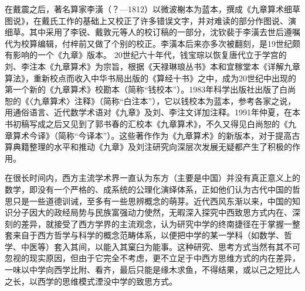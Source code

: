 \documentclass[a4paper,12pt,UTF8,twoside]{ctexbook}
\begin{document}
在戴震之后，著名算家李潢（？—1812）以微波榭本为蓝本，撰成《九章算术细草图说》，在戴氏工作的基础上又校正了许多错误文字，并对难读的部分作图说、演细草。其中采用了李锐、戴敦元等人的校订稿的一部分，沈钦裴于李潢去世后遵嘱代为校算编辑，付梓前又做了个别的校正。李潢本后来亦多次被翻刻，是19世纪颇有影响的一个《九章》版本。
20世纪六十年代，钱宝琮以恢复唐代立于学宫的刘、李注本《九章算术》为宗旨，根据《天禄琳琅丛书》本和宜稼堂本《详解九章算法》，重新校点而收入中华书局出版的《算经十书》之中，成为20世纪中出现的第一个新的《九章算术》校勘本（简称“钱校本”）。1983年科学出版社出版了白尚恕的《〈九章算术〉注释》（简称“白注本”），它以钱校本为蓝本，参考各家之说，用通俗语言、近代数学术语对《九章》及刘、李注文详加注释。1991年仲夏，在本书初稿写成之后又见到了郭书春的汇校本《九章算术》，不久又得见白尚恕的《九章算术今译》（简称“今译本”）。这些著作作为《九章算术》的新版本，对于提高古算典籍整理的水平和推动《九章》及刘注研究向深层次发展无疑都产生了积极的作用。




在很长时间内，西方主流学术界一直认为东方（主要是中国）并没有真正意义上的数学，即没有一个严格的、成系统的公理化演绎体系，正如他们认为古代中国的哲思只是一些道德训诫，至多有一些思辨概念的萌芽。近代西风东渐以来，中国的知识分子因大的政经局势与民族富强动力使然，无暇深入探究中西致思方式内在、深刻的差异，就接受了西方学界的主流观念，认为研究中学的终南捷径在于掌握一整套来自于西方哲学与科学的概念范畴体系，以便把中学的某一学科（如数学、哲学、中医等）套入其间，以能入其窠臼为能事。这种研究、思考方式当然有其不可忽视的现实原因，但由于它完全不考虑，更不立足于中西方思维方式的内在差异，一味以中学向西学比附、看齐，最后只能是缘木求鱼，不得结果，或以己之短比人之长，以西学的思维模式湮没中学的致思方式。
\end{document}
